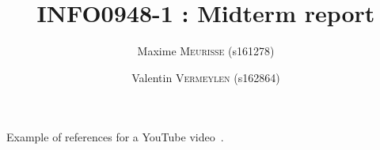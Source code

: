 \documentclass[a4paper, 10pt, conference]{ieeeconf}
\title{INFO0948-1 : Midterm report}
\author{Maxime \textsc{Meurisse} (s161278) \and Valentin \textsc{Vermeylen} (s162864)}
\begin{document}
    
    \maketitle
    \thispagestyle{plain}
    \pagestyle{plain}
    
    
    
    \lipsum
    Example of references for a YouTube video~\cite{BostonDynamics:2019aa}.
    
    
    
    
    
\end{document}
